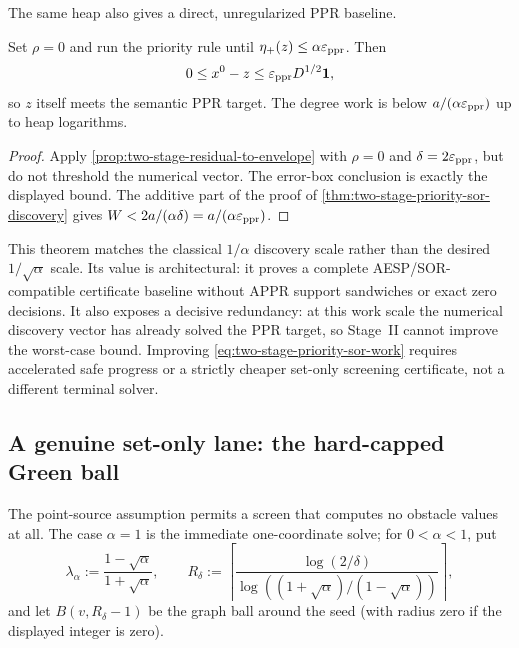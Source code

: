 The same heap also gives a direct, unregularized PPR baseline.

\begin{corollary}
\label{cor:two-stage-direct-priority-ppr}
Set $\rho=0$ and run the priority rule until
$\eta_+(z)\leq\alpha\varepsilon_{\mathrm{ppr}}$.  Then
\begin{equation*}
 0\leq x^0-z\leq\varepsilon_{\mathrm{ppr}} D^{1/2}\mathbf{1},
\end{equation*}
so $z$ itself meets the semantic PPR target.  The degree work is below
$a/(\alpha\varepsilon_{\mathrm{ppr}})$ up to heap logarithms.
\end{corollary}

\begin{proof}
Apply \cref{prop:two-stage-residual-to-envelope} with $\rho=0$ and
$\delta=2\varepsilon_{\mathrm{ppr}}$, but do not threshold the numerical vector.  The error-box
conclusion is exactly the displayed bound.  The additive part of the proof of
\cref{thm:two-stage-priority-sor-discovery} gives
$W<2a/(\alpha\delta)=a/(\alpha\varepsilon_{\mathrm{ppr}})$.
\end{proof}

This theorem matches the classical $1/\alpha$ discovery scale rather than
the desired $1/\sqrt\alpha$ scale.  Its value is architectural: it proves a
complete AESP/SOR-compatible certificate baseline without APPR support
sandwiches or exact zero decisions.  It also exposes a decisive redundancy:
at this work scale the numerical discovery vector has already solved the PPR
target, so Stage~II cannot improve the worst-case bound.  Improving
\cref{eq:two-stage-priority-sor-work} requires accelerated safe progress or a
strictly cheaper set-only screening certificate, not a different terminal
solver.

\subsection{A genuine set-only lane: the hard-capped Green ball}

The point-source assumption permits a screen that computes no obstacle
values at all.  The case $\alpha=1$ is the immediate one-coordinate solve;
for $0<\alpha<1$, put
\begin{equation*}
 \lambda_\alpha:=\frac{1-\sqrt\alpha}{1+\sqrt\alpha},
 \qquad
 R_\delta:=
 \left\lceil
  \frac{\log(2/\delta)}
       {\log((1+\sqrt\alpha)/(1-\sqrt\alpha))}
 \right\rceil,
\end{equation*}
and let $B(v,R_\delta-1)$ be the graph ball around the seed (with radius zero
if the displayed integer is zero).

